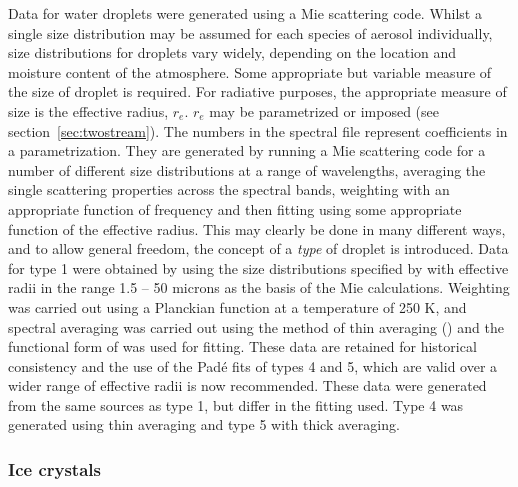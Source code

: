 Data for water droplets were generated using a Mie scattering code. 
Whilst a single size distribution may be assumed for each species
of aerosol individually, size distributions for droplets vary widely,
depending on the location and moisture content of the atmosphere. Some
appropriate but variable measure of the size of droplet is required.
For radiative purposes, the
appropriate measure of size is the effective radius, $r_e$. $r_e$
may be parametrized or imposed (see section~\ref{sec:twostream}). The numbers in the
spectral file represent coefficients in a parametrization. They
are generated by running a Mie scattering code for a number of different
size distributions at a range of wavelengths, averaging the single
scattering properties across the spectral bands, weighting with an
appropriate function of frequency and then fitting using some appropriate
function of the effective radius. This may clearly be done in many
different ways, and to allow general freedom, the concept of a {\em
type} of droplet is introduced.  Data for type 1 were obtained by
using the size distributions specified by \citet{Rockel91} with effective
radii in the range 1.5 -- 50 microns 
as the basis of the Mie calculations. Weighting
was carried out using a Planckian function at a temperature of 250 K,
and spectral averaging was carried out using the method of 
thin averaging (\citet{Edwards96rc}) and
the functional form of \citet{Slingo82} was used for fitting. 
These data are retained for historical consistency and the use of
the Pad\'e fits of types 4 and 5, which are valid over a wider range
of effective radii is now recommended. These data were generated from 
the same sources as type 1, but differ in the fitting used. Type 4
was generated using thin averaging and type 5 with thick averaging.

\subsubsection*{Ice crystals}

